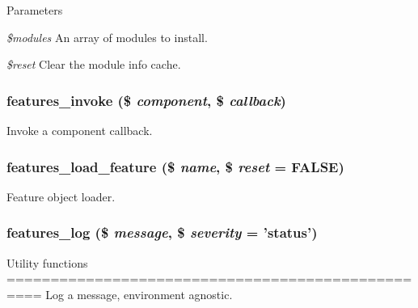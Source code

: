\begin{DoxyParams}{Parameters}
\item[{\em \$modules}]An array of modules to install. \item[{\em \$reset}]Clear the module info cache. \end{DoxyParams}
\hypertarget{features_8module_a0bcd406d15618a70e5be91e70d5d9d05}{
\subsubsection[{features\_\-invoke}]{\setlength{\rightskip}{0pt plus 5cm}features\_\-invoke (\$ {\em component}, \/  \$ {\em callback})}}
\label{features_8module_a0bcd406d15618a70e5be91e70d5d9d05}
Invoke a component callback. \hypertarget{features_8module_abbc16356d1df3bc150b0bd56d35b00f8}{
\subsubsection[{features\_\-load\_\-feature}]{\setlength{\rightskip}{0pt plus 5cm}features\_\-load\_\-feature (\$ {\em name}, \/  \$ {\em reset} = {\ttfamily FALSE})}}
\label{features_8module_abbc16356d1df3bc150b0bd56d35b00f8}
Feature object loader. \hypertarget{features_8module_ad31fc2380edc2e353c945257ffd6b731}{
\subsubsection[{features\_\-log}]{\setlength{\rightskip}{0pt plus 5cm}features\_\-log (\$ {\em message}, \/  \$ {\em severity} = {\ttfamily 'status'})}}
\label{features_8module_ad31fc2380edc2e353c945257ffd6b731}
Utility functions ================================================== Log a message, environment agnostic.


